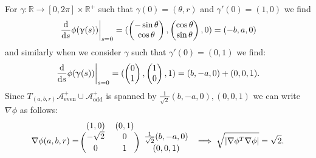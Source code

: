 \documentclass{article}
\newcommand{\aeven}{\mathcal{A}_{\mathrm{even}}^+}
\newcommand{\aodd}{\mathcal{A}_{\mathrm{odd}}^+}
\newcommand{\ud}{\mathrm{d}}
\newcommand{\dby}[1]{\frac{\ud}{\ud #1}}
\begin{document}
For $\gamma : \mathbb{R} \to [0, 2\pi] \times \mathbb{R}^+$ such that $\gamma(0) = (\theta, r)$ and $\gamma'(0) = (1, 0)$ we find
$$
\left. \dby{s} \phi(\gamma(s)) \right|_{s=0} = \parens{\begin{pmatrix} -\sin \theta \\ \cos \theta \end{pmatrix}, \begin{pmatrix} \cos \theta \\ \sin\theta \end{pmatrix}, 0} = \parens{-b, a, 0}
$$
and similarly when we consider $\gamma$ such that $\gamma'(0) = (0, 1)$ we find:
$$
\left. \dby{s} \phi(\gamma(s)) \right|_{s=0} = \parens{ \begin{pmatrix} 0 \\ 1 \end{pmatrix}, \begin{pmatrix} 1 \\ 0 \end{pmatrix}, 1 } = \parens{b, -a, 0} + \parens{0, 0, 1}.
$$
Since $T_{(a, b, r)} \aeven \cup \aodd$ is spanned by $\frac{1}{\sqrt{2}} (b, -a, 0), (0, 0, 1)$ we can write $\nabla \phi$ as follows:
$$
\nabla \phi (a, b, r) = \begin{blockarray}{ccc}
  (1, 0) & (0, 1) \\
  \begin{block}{(cc)c}
    -\sqrt{2} & 0 & \frac{1}{\sqrt{2}} (b, -a, 0) \\
    0 & 1 & (0, 0, 1)  \\
  \end{block}
\end{blockarray} \implies \sqrt{\abs{\nabla \phi^T \nabla \phi}} = \sqrt{2}.
$$
\end{document}
